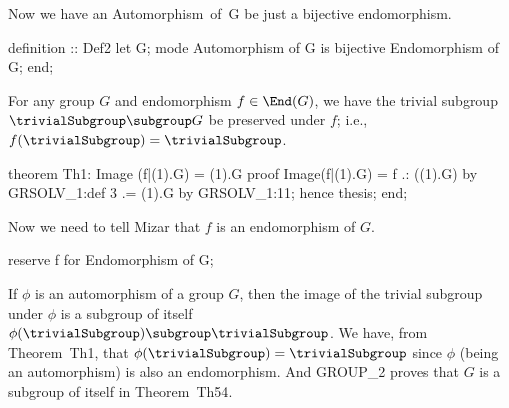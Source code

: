 \nwendcode{}\nwdocspar

Now we have an {\Tt{}Automorphism\ of\ G\nwendquote} be just a bijective endomorphism.

\nwenddocs{}\endmoddef\nwstartdeflinemarkup{}\nwenddeflinemarkup
definition :: Def2
  let G;
  mode Automorphism of G is bijective Endomorphism of G;
end;

\nwendcode{}\nwdocspar

\M For any group $G$ and endomorphism $f\in\End(G)$, we have the trivial
subgroup $\trivialSubgroup\subgroup G$ be preserved under $f$; i.e.,
$f(\trivialSubgroup)=\trivialSubgroup$.

\nwenddocs{}\endmoddef\nwstartdeflinemarkup{}\nwenddeflinemarkup
theorem Th1:
  Image (f|(1).G) = (1).G
proof
  Image(f|(1).G) = f .: ((1).G) by GRSOLV_1:def 3
  .= (1).G by GRSOLV_1:11;
  hence thesis;
end;

\nwendcode{}\nwdocspar

\M Now we need to tell Mizar that $f$ is an endomorphism of $G$.

\nwenddocs{}\plusendmoddef\nwstartdeflinemarkup{}\nwenddeflinemarkup
reserve f for Endomorphism of G;

\nwendcode{}\nwdocspar

\M If $\phi$ is an automorphism of a group $G$, then
the image of the trivial subgroup under $\phi$ is a subgroup of itself
$\phi(\trivialSubgroup)\subgroup\trivialSubgroup$. We have, from
Theorem~{\Tt{}Th1\nwendquote}, that $\phi(\trivialSubgroup)=\trivialSubgroup$ since
$\phi$ (being an automorphism) is also an endomorphism. And {\Tt{}GROUP{\_}2\nwendquote}
proves that $G$ is a subgroup of itself in Theorem~{\Tt{}Th54\nwendquote}.

